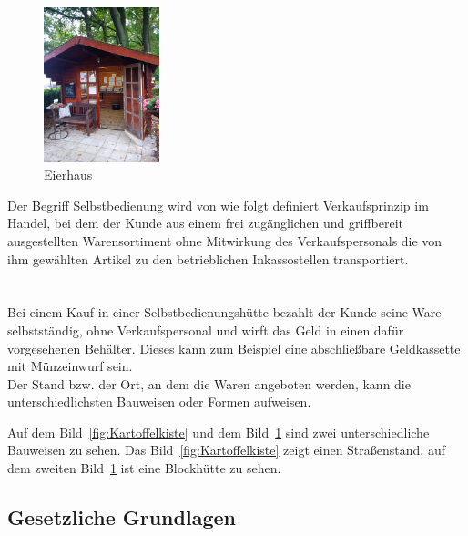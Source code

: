 \begin{figure}[hh]
	\centering
	\includegraphics[width=0.3\textwidth,angle=0]{abb/Eierhaus}
	\caption[Eierhaus]{Eierhaus }
	\label{fig:Eierhaus}
\end{figure}


Der Begriff Selbstbedienung wird von \cite{Selbstbedienung} wie folgt definiert \glqq Verkaufsprinzip im Handel, bei dem der Kunde aus einem frei zugänglichen und griffbereit ausgestellten Warensortiment ohne Mitwirkung des Verkaufspersonals die von ihm gewählten Artikel zu den betrieblichen Inkassostellen transportiert.\grqq{} 
\\
\\
\\
Bei einem Kauf in einer Selbstbedienungshütte bezahlt der Kunde seine Ware 
selbstständig, ohne Verkaufspersonal und wirft das Geld in einen dafür vorgesehenen Behälter. Dieses kann zum Beispiel eine abschließbare Geldkassette mit Münzeinwurf sein.
\\
Der Stand bzw. der Ort, an dem die Waren angeboten werden, kann die unterschiedlichsten Bauweisen oder Formen aufweisen.

Auf dem Bild~\ref{fig:Kartoffelkiste} und dem Bild~\ref{fig:Eierhaus} sind zwei unterschiedliche Bauweisen zu sehen. Das Bild~\ref{fig:Kartoffelkiste} zeigt einen Straßenstand, auf dem zweiten Bild~\ref{fig:Eierhaus} ist eine Blockhütte zu sehen.


\subsection{Gesetzliche Grundlagen}\label{gesetzliche Grundlagen}

